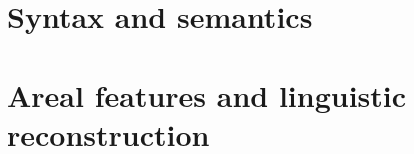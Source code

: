 \documentclass[output=book
		,modfonts,nonflat
	        ,collection
	        ,collectionchapter
		,colorlinks,citecolor=brown 	
		,showindex
		  ]{langsci/langscibook}
\begin{document}
 \part{Syntax and semantics}
 \part{Areal features and linguistic reconstruction}
% 
\end{document}
